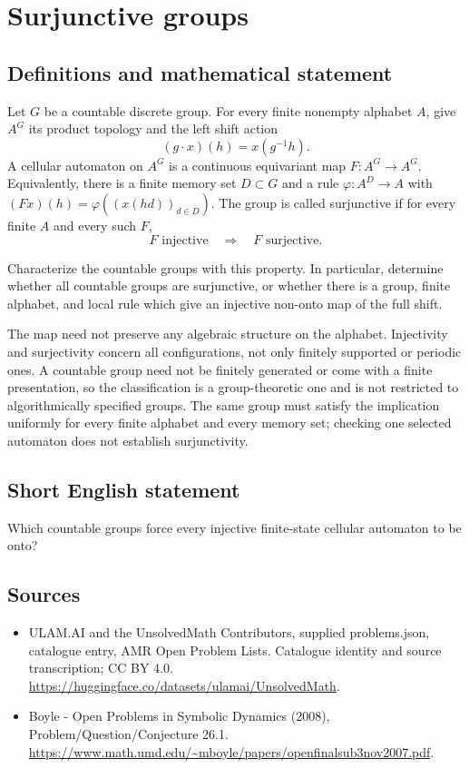 \documentclass[11pt,a4paper]{article}
\begin{document}
\section*{Surjunctive groups}\label{statement}

\subsection{Definitions and mathematical statement}
Let $G$ be a countable discrete group. For every finite nonempty
alphabet $A$, give $A^G$ its product topology and the left
shift action
\[
                   (g\cdot x)(h)=x(g^{-1}h).
\]
A cellular automaton on $A^G$ is a continuous equivariant map
$F:A^G\to A^G$. Equivalently, there is a finite memory set
$D\subset G$ and a rule $\varphi:A^D\to A$ with
$(Fx)(h)=\varphi((x(hd))_{d\in D})$.
The group is called surjunctive if for every finite $A$ and
every such $F$,
\[
                       F\text{ injective}\quad\Longrightarrow\quad
                       F\text{ surjective}.
\]

Characterize the countable groups with this property. In
particular, determine whether all countable groups are
surjunctive, or whether there is a group, finite alphabet, and
local rule which give an injective non-onto map of the full
shift.

The map need not preserve any algebraic structure on the
alphabet. Injectivity and surjectivity concern all configurations,
not only finitely supported or periodic ones. A countable group
need not be finitely generated or come with a finite presentation,
so the classification is a group-theoretic one and is not
restricted to algorithmically specified groups. The same group
must satisfy the implication uniformly for every finite alphabet
and every memory set; checking one selected automaton does
not establish surjunctivity.
\subsection{Short English statement}
Which countable groups force every injective finite-state cellular automaton to be onto?
\subsection{Sources}
\begin{itemize}
\item[S1] ULAM.AI and the UnsolvedMath Contributors, supplied problems.json, catalogue entry, AMR Open Problem Lists. Catalogue identity and source transcription; CC BY 4.0.
\url{https://huggingface.co/datasets/ulamai/UnsolvedMath}.
\item[S2] Boyle - Open Problems in Symbolic Dynamics (2008), Problem/Question/Conjecture 26.1. 
\url{https://www.math.umd.edu/~mboyle/papers/openfinalsub3nov2007.pdf}.
\end{itemize}
\end{document}

